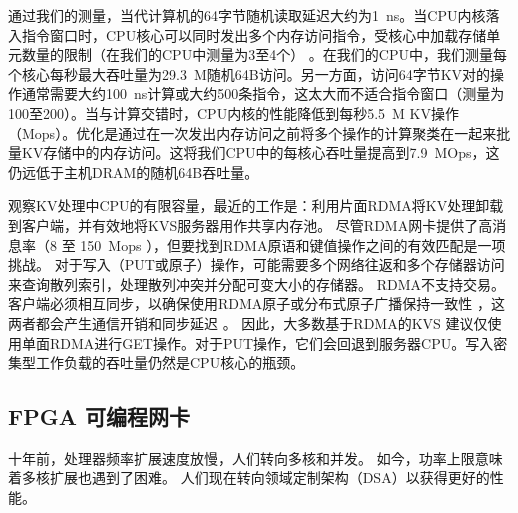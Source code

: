通过我们的测量，当代计算机的64字节随机读取延迟大约为1~ns。当CPU内核落入指令窗口时，CPU核心可以同时发出多个内存访问指令，受核心中加载存储单元数量的限制（在我们的CPU中测量为3至4个） \cite {gharachorloo1992hiding,han2010packetshader,zhang2015mega}。在我们的CPU中，我们测量每个核心每秒最大吞吐量为29.3~M随机64B访问。另一方面，访问64字节KV对的操作通常需要大约100~ns计算或大约500条指令，这太大而不适合指令窗口（测量为100至200）。当与计算交错时，CPU内核的性能降低到每秒5.5~M KV操作（Mops）。优化是通过在一次发出内存访问之前将多个操作的计算聚类在一起来批量KV存储中的内存访问\cite {li2016full,narula2014phase}。这将我们CPU中的每核心吞吐量提高到7.9~MOps，这仍远低于主机DRAM的随机64B吞吐量。

观察KV处理中CPU的有限容量，最近的工作是：利用片面RDMA将KV处理卸载到客户端，并有效地将KVS服务器用作共享内存池。
尽管RDMA网卡提供了高消息率（8 至 150~Mops \cite {kalia2016design}），但要找到RDMA原语和键值操作之间的有效匹配是一项挑战。
对于写入（PUT或原子）操作，可能需要多个网络往返和多个存储器访问来查询散列索引，处理散列冲突并分配可变大小的存储器。
RDMA不支持交易。客户端必须相互同步，以确保使用RDMA原子或分布式原子广播保持一致性 \cite{szepesi2014designing}，这两者都会产生通信开销和同步延迟 \cite {mitchell2013using,dragojevic2014farm}。
因此，大多数基于RDMA的KVS \cite {mitchell2013using,dragojevic2014farm,kalia2014using}建议仅使用单面RDMA进行GET操作。对于PUT操作，它们会回退到服务器CPU。写入密集型工作负载的吞吐量仍然是CPU核心的瓶颈。

\subsection{FPGA 可编程网卡}
\label{kvdirect:sec:programmable-nic}

十年前，处理器频率扩展速度放慢，人们转向多核和并发\cite {sutter2005free}。
如今，功率上限意味着多核扩展也遇到了困难\cite {esmaeilzadeh2013power}。
人们现在转向领域定制架构（DSA）以获得更好的性能。


